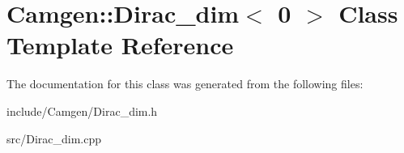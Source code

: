 \hypertarget{a00132}{\section{Camgen\-:\-:Dirac\-\_\-dim$<$ 0 $>$ Class Template Reference}
\label{a00132}
}


The documentation for this class was generated from the following files\-:\begin{DoxyCompactItemize}
\item 
include/\-Camgen/Dirac\-\_\-dim.\-h\item 
src/Dirac\-\_\-dim.\-cpp\end{DoxyCompactItemize}
